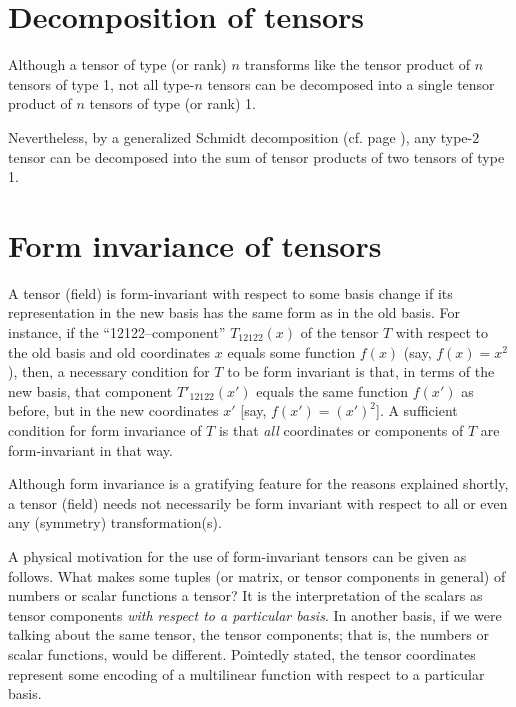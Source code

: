 \section{Decomposition of tensors}

Although a tensor of type (or rank) $n$ transforms like the tensor product of $n$ tensors of type 1,
not all type-$n$ tensors can be decomposed into a single
tensor product of $n$ tensors of type (or rank) 1.

Nevertheless,
by a generalized Schmidt decomposition (cf. page \pageref{2011-m-Schmidtdecomposition}),
any type-$2$ tensor  can be decomposed into
the sum of
tensor products of two tensors of type 1.

\section{Form invariance of tensors}

A tensor (field) is
form-invariant  with respect to some basis change
if its representation in the new basis has the same form as in the old basis.
For instance, if the ``12122--component'' $T_{12122} (x)$ of the tensor $T$
with respect to the old basis and old coordinates $x$   equals some function $f(x)$ (say, $f(x)=x^2$),
then, a necessary condition for $T$ to be form invariant is that, in terms of the new basis,
that component  $T'_{12122} (x')$  equals the same function $f(x')$ as before, but in the new coordinates $x'$
[say, $f(x')=(x')^2$].
A sufficient condition for form invariance of $T$ is that {\em all}
coordinates or components of $T$ are form-invariant in that way.


Although form invariance is a gratifying feature for the reasons explained shortly,
a tensor (field) needs not necessarily
be form invariant with respect to all or even any (symmetry) transformation(s).



A physical motivation for the use of form-invariant tensors can be given as follows.
What makes some tuples (or matrix, or tensor components in general)  of
numbers or scalar functions a tensor? It is the
interpretation of the scalars as tensor components {\em with respect to
a particular basis}. In another basis, if we were talking about the same
tensor, the tensor components; that is, the numbers or scalar functions,
would be different.
Pointedly stated, the tensor coordinates represent some
encoding of a multilinear function with respect to a particular basis.

